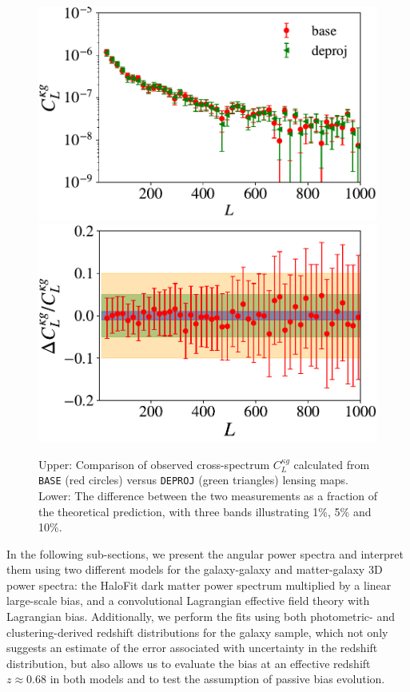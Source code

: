 \documentclass[a4paper,usenatbib]{mnras}
\begin{document}
\begin{figure}
\includegraphics[width=0.9\linewidth]{figures/basevdeproj.pdf}
\vspace{1cm}
\includegraphics[width=0.9\linewidth]{figures/basevdeproj_frac.pdf}
\caption{Upper: Comparison of observed cross-spectrum $C_{L}^{\kappa g}$ calculated from \texttt{BASE} (red circles) versus \texttt{DEPROJ} (green triangles) lensing maps. Lower: The difference between the two measurements as a fraction of the theoretical prediction, with three bands illustrating 1\%, 5\% and 10\%.}
\label{fig:basevdeproj}
\end{figure}

In the following sub-sections, we present the angular power spectra and interpret them using two different models for the galaxy-galaxy and matter-galaxy 3D power spectra: the HaloFit dark matter power spectrum multiplied by a linear large-scale bias, and a convolutional Lagrangian effective field theory with Lagrangian bias. Additionally, we perform the fits using both photometric- and clustering-derived redshift distributions for the galaxy sample, which not only suggests an estimate of the error associated with uncertainty in the redshift distribution, but also allows us to evaluate the bias at an effective redshift $z \approx 0.68$ in both models and to test the assumption of passive bias evolution. 
\end{document}
